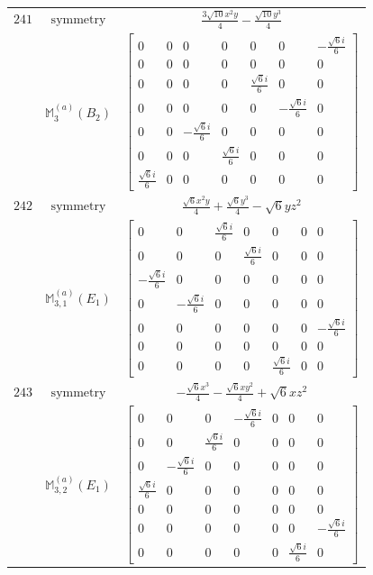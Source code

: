 \documentclass[fleqn,8pt,landscape]{jsarticle}
\begin{document}
\begin{longtable}{ccc}
$ 241 $ & $ \text{symmetry} $ & $ \frac{3 \sqrt{10} x^{2} y}{4} - \frac{\sqrt{10} y^{3}}{4} $ \\
$  $ & $ \mathbb{M}_{3}^{(a)}(B_{2}) $ & $ \begin{bmatrix} 0 & 0 & 0 & 0 & 0 & 0 & - \frac{\sqrt{6} i}{6} \\ 0 & 0 & 0 & 0 & 0 & 0 & 0 \\ 0 & 0 & 0 & 0 & \frac{\sqrt{6} i}{6} & 0 & 0 \\ 0 & 0 & 0 & 0 & 0 & - \frac{\sqrt{6} i}{6} & 0 \\ 0 & 0 & - \frac{\sqrt{6} i}{6} & 0 & 0 & 0 & 0 \\ 0 & 0 & 0 & \frac{\sqrt{6} i}{6} & 0 & 0 & 0 \\ \frac{\sqrt{6} i}{6} & 0 & 0 & 0 & 0 & 0 & 0 \end{bmatrix} $ \\ \hline
$ 242 $ & $ \text{symmetry} $ & $ \frac{\sqrt{6} x^{2} y}{4} + \frac{\sqrt{6} y^{3}}{4} - \sqrt{6} y z^{2} $ \\
$  $ & $ \mathbb{M}_{3,1}^{(a)}(E_{1}) $ & $ \begin{bmatrix} 0 & 0 & \frac{\sqrt{6} i}{6} & 0 & 0 & 0 & 0 \\ 0 & 0 & 0 & \frac{\sqrt{6} i}{6} & 0 & 0 & 0 \\ - \frac{\sqrt{6} i}{6} & 0 & 0 & 0 & 0 & 0 & 0 \\ 0 & - \frac{\sqrt{6} i}{6} & 0 & 0 & 0 & 0 & 0 \\ 0 & 0 & 0 & 0 & 0 & 0 & - \frac{\sqrt{6} i}{6} \\ 0 & 0 & 0 & 0 & 0 & 0 & 0 \\ 0 & 0 & 0 & 0 & \frac{\sqrt{6} i}{6} & 0 & 0 \end{bmatrix} $ \\ \hline
$ 243 $ & $ \text{symmetry} $ & $ - \frac{\sqrt{6} x^{3}}{4} - \frac{\sqrt{6} x y^{2}}{4} + \sqrt{6} x z^{2} $ \\
$  $ & $ \mathbb{M}_{3,2}^{(a)}(E_{1}) $ & $ \begin{bmatrix} 0 & 0 & 0 & - \frac{\sqrt{6} i}{6} & 0 & 0 & 0 \\ 0 & 0 & \frac{\sqrt{6} i}{6} & 0 & 0 & 0 & 0 \\ 0 & - \frac{\sqrt{6} i}{6} & 0 & 0 & 0 & 0 & 0 \\ \frac{\sqrt{6} i}{6} & 0 & 0 & 0 & 0 & 0 & 0 \\ 0 & 0 & 0 & 0 & 0 & 0 & 0 \\ 0 & 0 & 0 & 0 & 0 & 0 & - \frac{\sqrt{6} i}{6} \\ 0 & 0 & 0 & 0 & 0 & \frac{\sqrt{6} i}{6} & 0 \end{bmatrix} $ \\ \hline

\end{longtable}
\end{document}
